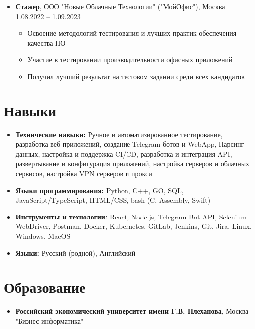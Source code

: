 \documentclass[a4paper,11pt]{article}
\begin{document}
\begin{itemize}[leftmargin=*]
  \item \textbf{Стажер}, ООО "Новые Облачные Технологии" ("МойОфис"), Москва \hfill 1.08.2022 -- 1.09.2023
  \begin{itemize}
    \item Освоение методологий тестирования и лучших практик обеспечения качества ПО
    \item Участие в тестировании производительности офисных приложений
    \item Получил лучший результат на тестовом задании среди всех кандидатов
  \end{itemize}
\end{itemize}

\section{Навыки}
\begin{itemize}[leftmargin=*]
  \item \textbf{Технические навыки:} Ручное и автоматизированное тестирование,
   разработка веб-приложений, создание Telegram-ботов и WebApp,
   Парсинг данных,
   настройка и поддержка CI/CD, разработка и интеграция API,
   развертывание и конфигурация приложений,
   настройка серверов и облачных сервисов,
   настройка VPN серверов и прокси

  \item \textbf{Языки программирования:} Python, C++, GO, SQL, JavaScript/TypeScript, HTML/CSS, bash (C, Assembly, Swift)

  \item \textbf{Инструменты и технологии:} React, Node.js, Telegram Bot API, Selenium WebDriver, Postman, Docker, Kubernetes, GitLab, Jenkins, Git, Jira, Linux, Windows, MacOS

  \item \textbf{Языки:} Русский (родной), Английский
\end{itemize}

\section{Образование}
\begin{itemize}[leftmargin=*]
  \item \textbf{Российский экономический университет имени Г.В. Плеханова}, Москва \hfill\\
  "Бизнес-информатика"\\

\end{itemize}
\end{document}
